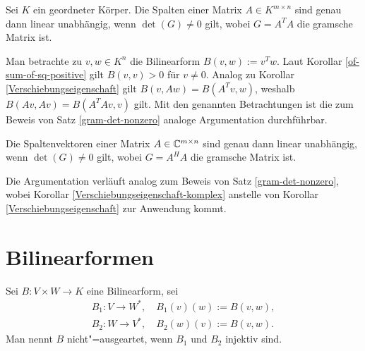 \begin{Satz}
Sei $K$ ein geordneter Körper. Die Spalten einer Matrix
$A\in K^{m\times n}$ sind genau dann linear unabhängig, wenn
$\det(G)\ne 0$ gilt, wobei $G=A^T A$ die gramsche Matrix ist.
\end{Satz}
\begin{Beweis}
Man betrachte zu $v,w\in K^n$ die Bilinearform $B(v,w):=v^T w$.
Laut Korollar \ref{of-sum-of-sq-positive} gilt $B(v,v)>0$ für
$v\ne 0$. Analog zu Korollar \ref{Verschiebungseigenschaft} gilt
$B(v,Aw) = B(A^T v,w)$, weshalb $B(Av,Av) = B(A^T A v,v)$  gilt.
Mit den genannten Betrachtungen ist die zum Beweis von Satz
\ref{gram-det-nonzero} analoge Argumentation
durchführbar.\,\qedsymbol
\end{Beweis}

\begin{Satz}
Die Spaltenvektoren einer Matrix $A\in\mathbb C^{m\times n}$ sind
genau dann linear unabhängig, wenn $\det(G)\ne 0$ gilt, wobei
$G=A^H A$ die gramsche Matrix ist.
\end{Satz}
\begin{Beweis}
Die Argumentation verläuft analog zum Beweis von Satz
\ref{gram-det-nonzero}, wobei Korollar
\ref{Verschiebungseigenschaft-komplex} anstelle von
Korollar \ref{Verschiebungseigenschaft} zur Anwendung kommt.\,\qedsymbol
\end{Beweis}

\newpage
\section{Bilinearformen}

\begin{Definition}%
\label{def:degenerate}\newlinefirst
Sei $B\colon V\times W\to K$ eine Bilinearform, sei
\begin{align*}
B_1\colon V\to W^*,\quad B_1(v)(w):=B(v,w),\\
B_2\colon W\to V^*,\quad B_2(w)(v):=B(v,w).
\end{align*}
Man nennt $B$ nicht"=ausgeartet, wenn $B_1$ und $B_2$ injektiv sind.
\end{Definition}

